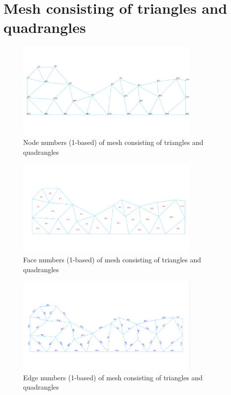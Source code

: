 \documentclass[biblatex]{deltares_memo}
\begin{document}
\section{Mesh consisting of triangles and quadrangles\label{sec:quadrangles}}
\begin{figure}[H]
	\centering
	\includegraphics[width=0.8\textwidth]{pictures/node_numbers_quadrangles.png}
	\caption{Node numbers (1-based) of mesh consisting of triangles and quadrangles}
\end{figure}
\begin{figure}[H]
	\centering
	\includegraphics[width=0.8\textwidth]{pictures/face_numbers_quadrangles.png}
	\caption{Face numbers (1-based) of mesh consisting of triangles and quadrangles}
\end{figure}
\begin{figure}[H]
	\centering
	\includegraphics[width=0.8\textwidth]{pictures/edge_numbers_quadrangles.png}
	\caption{Edge numbers (1-based) of mesh consisting of triangles and quadrangles}
\end{figure}
\end{document}
